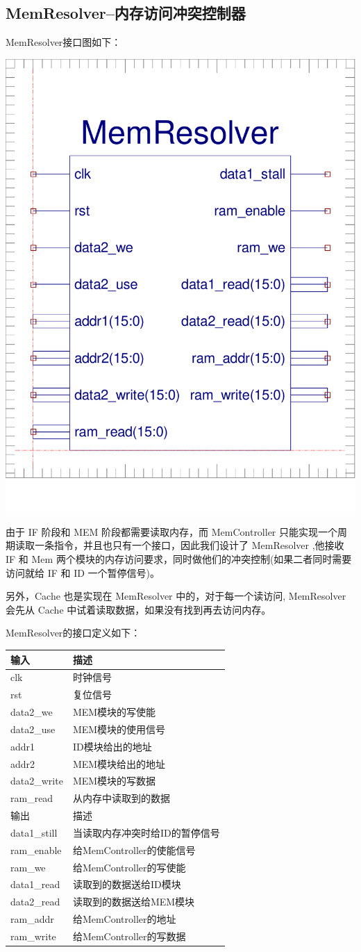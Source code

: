 \documentclass[10pt]{article}
\begin{document}
\begin{CJK}{UTF8}{gbsn}
\subsection{MemResolver--内存访问冲突控制器}
MemResolver接口图如下：\\
\begin{center}
\includegraphics[width=0.5\linewidth]{MemResolver.pdf}
\end{center}
由于 IF 阶段和 MEM 阶段都需要读取内存，而 MemController 只能实现一个周期读取一条指令，并且也只有一个接口，因此我们设计了
MemResolver ,他接收 IF 和 Mem 两个模块的内存访问要求，同时做他们的冲突控制(如果二者同时需要访问就给 IF 和 ID 一个暂停信号)。

另外，Cache 也是实现在 MemResolver 中的，对于每一个读访问, MemResolver 会先从 Cache 中试着读取数据，如果没有找到再去访问内存。

MemResolver的接口定义如下：\\
\begin{center}
\begin{tabular}{|l|l|}\hline
输入&描述\\\hline
clk&时钟信号\\\hline
rst&复位信号\\\hline
data2\_we&MEM模块的写使能\\\hline
data2\_use&MEM模块的使用信号\\\hline
addr1&ID模块给出的地址\\\hline
addr2&MEM模块给出的地址\\\hline
data2\_write&MEM模块的写数据\\\hline
ram\_read&从内存中读取到的数据\\\hline\hline
输出&描述\\\hline
data1\_still&当读取内存冲突时给ID的暂停信号\\\hline
ram\_enable&给MemController的使能信号\\\hline
ram\_we&给MemController的写使能\\\hline
data1\_read&读取到的数据送给ID模块\\\hline
data2\_read&读取到的数据送给MEM模块\\\hline
ram\_addr&给MemController的地址\\\hline
ram\_write&给MemController的写数据\\\hline
\end{tabular}
\end{center}


\end{CJK}
\end{document}
